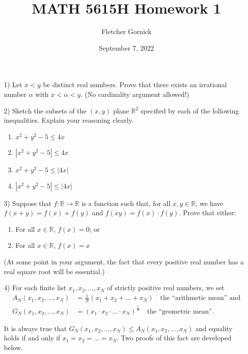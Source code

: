 \documentclass[11pt]{article}
\title{\vspace{-1.0cm}MATH 5615H Homework 1}
\author{Fletcher Gornick}
\date{September 7, 2022}
\begin{document}
 \maketitle

 1) Let \(x < y\) be distinct real numbers.  Prove that there exists an irrational number \(\alpha\) with
 \(x < \alpha < y\).  (No cardinality argument allowed!)
 \newpage

 2) Sketch the subsets of the \((x,y)\) plane \(\mathbb{R}^2\) specified by each of the following inequalities.
 Explain your reasoning clearly.

 \begin{enumerate}[label=(\roman*)]
   \item \(x^2 + y^2 - 5 \leq 4x\)
   \item \(|x^2 + y^2 - 5| \leq 4x\)
   \item \(x^2 + y^2 - 5 \leq |4x|\)
   \item \(|x^2 + y^2 - 5| \leq |4x|\)
 \end{enumerate}
 \newpage

 3) Suppose that \(f : \mathbb{R} \rightarrow \mathbb{R}\) is a function such that, for all \(x,y \in \mathbb{R}\),
 we have \(f(x+y) = f(x) + f(y)\) and \(f(xy) = f(x) \cdot f(y)\).  Prove that either:

 \begin{enumerate}[label=(\roman*)]
   \item For all \(x \in \mathbb{R}\), \(f(x) = 0\); or
   \item For all \(x \in \mathbb{R}\), \(f(x) = x\)
 \end{enumerate}
 (At some point in your argument, the fact that every positive real number has a real square root will be essential.)
 \newpage

 4) For each finite list \(x_1, x_2, \dots, x_N\) of strictly positive real numbers, we set 
 \begin{align*}
   A_N (x_1, x_2, \dots, x_N) &= \frac{1}{N}(x_1 + x_2 + \dots + x_N) \quad \text{the ``arithmetic mean'' and} \\
   G_N (x_1, x_2, \dots, x_N) &= (x_1 \cdot x_2 \cdot \ldots \cdot x_N)^\frac{1}{N} \quad \text{the ``geometric mean''.}
 \end{align*}

 It is always true that \(G_N (x_1, x_2, \dots, x_N) \leq A_N (x_1, x_2, \dots, x_N)\) and equality holds if and only 
 if \(x_1 = x_2 = \ldots = x_N\).  Two proofs of this fact are developed below.
\end{document}
